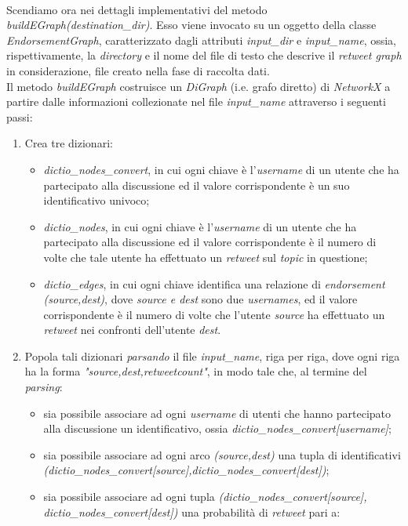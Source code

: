 \\Scendiamo ora nei dettagli implementativi del metodo \textit{buildEGraph(destination\_dir)}. Esso viene invocato su un oggetto della classe \textit{EndorsementGraph}, caratterizzato dagli attributi \textit{input\_dir} e \textit{input\_name}, ossia, rispettivamente, la \textit{directory} e il nome del file di testo che descrive il \textit{retweet graph} in considerazione, file creato nella fase di raccolta dati.
\\Il metodo \textit{buildEGraph} costruisce un \textit{DiGraph} (i.e. grafo diretto) di \textit{NetworkX} a partire dalle informazioni collezionate nel file \textit{input\_name} attraverso i seguenti passi:
\begin{enumerate}
\item Crea tre dizionari:
\begin{itemize}
\item \textit{dictio\_nodes\_convert}, in cui ogni chiave è l'\textit{username} di un utente che ha partecipato alla discussione ed il valore corrispondente è un suo identificativo univoco; 
\item \textit{dictio\_nodes}, in cui ogni chiave è l'\textit{username} di un utente che ha partecipato alla discussione ed il valore corrispondente è il numero di volte che tale utente ha effettuato un \textit{retweet} sul \textit{topic} in questione;
\item \textit{dictio\_edges}, in cui ogni chiave identifica una relazione di \textit{endorsement} \textit{(source,dest)}, dove \textit{source e dest} sono due \textit{usernames}, ed il valore corrispondente è il numero di volte che l'utente \textit{source} ha effettuato un \textit{retweet} nei confronti dell'utente \textit{dest}.
\end{itemize}
\item Popola tali dizionari \textit{parsando} il file \textit{input\_name}, riga per riga, dove ogni riga ha la forma \textit{"source,dest,retweetcount"}, in modo tale che, al termine del \textit{parsing}:
\begin{itemize}
\item sia possibile associare ad ogni \textit{username} di utenti che hanno partecipato alla discussione un identificativo, ossia \textit{dictio\_nodes\_convert[username]};
\item sia possibile associare ad ogni arco \textit{(source,dest)} una tupla di identificativi \textit{(dictio\_nodes\_convert[source],dictio\_nodes\_convert[dest])};
\item sia possibile associare ad ogni tupla \textit{(dictio\_nodes\_convert[source],\\dictio\_nodes\_convert[dest])} una probabilità di \textit{retweet} pari a:  


\end{itemize}
\end{enumerate}
